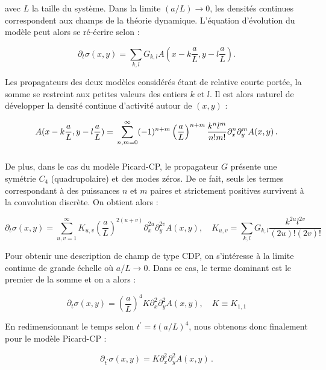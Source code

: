 \noindent avec $L$ la taille du système. Dans la limite $(a/L) \rightarrow 0$, les densités continues correspondent aux champs de la théorie dynamique. L'équation d'évolution du modèle peut alors se ré-écrire selon :

\begin{equation}
    \partial_t\sigma (x,y) = \sum_{k,l}G_{k,l}A(x-k\frac{a}{L}, y-l\frac{a}{L}).
    \label{eq:2}
\end{equation}

\noindent Les propagateurs des deux modèles considérés étant de relative courte portée, la somme se restreint aux petites valeurs des entiers $k$ et $l$. Il est alors naturel de développer la densité continue d'activité autour de $(x,y)$ :

\begin{equation}
    A(x-k\frac{a}{L}, y-l\frac{a}{L}) = \\ \sum_{n,m=0}^{\infty}(-1)^{n+m}\left( \frac{a}{L} \right)^{n+m}\frac{k^nl^m}{n!m!}\partial_x^n\partial_y^mA(x, y)\, .
\end{equation}

\subparagraph{}De plus, dans le cas du modèle Picard-CP, le propagateur $G$ présente une symétrie $C_4$ (quadrupolaire) et des modes zéros. De ce fait, seuls les termes correspondant à des puissances $n$ et $m$ paires et strictement positives survivent à la convolution discrète. On obtient alors :

\begin{equation}
    \partial_t\sigma (x,y) = \sum_{u,v=1}^{\infty}K_{u,v}\left( \frac{a}{L} \right)^{2(u+v)}\partial_x^{2u}\partial_y^{2v}A(x, y), \quad K_{u,v} = \sum_{k,l}G_{k,l}\frac{k^{2u}l^{2v}}{(2u)!(2v)!}
\label{eq:3}
\end{equation}

\noindent Pour obtenir une description de champ de type CDP, on s'intéresse à la limite continue de grande échelle où $a/L\rightarrow 0$. Dans ce cas, le terme dominant est le premier de la somme et on a alors :

\begin{equation}
    \partial_t\sigma (x,y) = \left( \frac{a}{L} \right)^{4}K\partial_x^{2}\partial_y^{2}A(x, y), \quad K \equiv K_{1,1}
    \label{eq:evol:sigma:CDP0:raw}
\end{equation}

\noindent En redimensionnant le temps selon $t^\prime=t(a/L)^4$, nous obtenons donc finalement pour le modèle Picard-CP :

\begin{equation}
    \partial_{t^\prime}\sigma (x,y) = K\partial_x^{2}\partial_y^{2}A(x, y)\, .
    \label{eq:evol:sigma:CDP0}
\end{equation}


